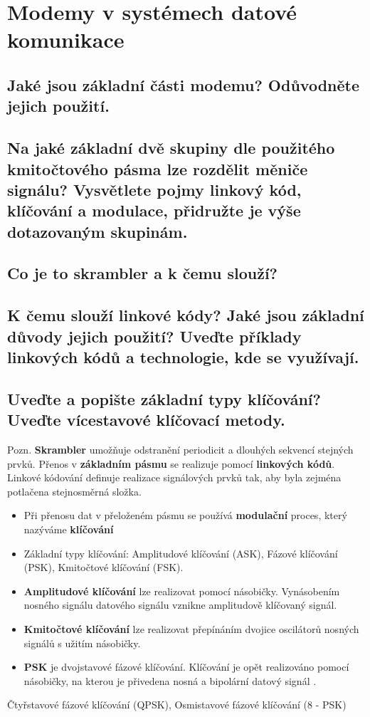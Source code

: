 \clearpage
\section{Modemy v systémech datové komunikace}
\subsection{Jaké jsou základní části modemu? Odůvodněte jejich použití.}

\subsection{Na jaké základní dvě skupiny dle použitého kmitočtového pásma lze rozdělit měniče
signálu? Vysvětlete pojmy linkový kód, klíčování a modulace, přidružte je výše
dotazovaným skupinám.}

\subsection{Co je to skrambler a k čemu slouží?}

\subsection{K čemu slouží linkové kódy? Jaké jsou základní důvody jejich použití? Uveďte příklady
linkových kódů a technologie, kde se využívají.}

\subsection{Uveďte a popište základní typy klíčování? Uveďte vícestavové klíčovací metody.}
Pozn. \textbf{Skrambler} umožňuje odstranění periodicit a dlouhých sekvencí stejných prvků. Přenos v \textbf{základním pásmu} se realizuje pomocí \textbf{linkových kódů}. Linkové kódování definuje realizace signálových prvků tak, aby byla zejména potlačena stejnosměrná složka.
\begin{itemize}
    \item Při přenosu dat v přeloženém pásmu se používá \textbf{modulační} proces, který nazýváme \textbf{klíčování}
    \item Základní typy klíčování: Amplitudové klíčování (ASK), Fázové klíčování (PSK), Kmitočtové klíčování (FSK).
    \item \textbf{Amplitudové klíčování} lze realizovat pomocí násobičky. Vynásobením nosného signálu datového signálu vznikne amplitudově klíčovaný signál. 
    \item \textbf{Kmitočtové klíčování} lze realizovat přepínáním dvojice oscilátorů nosných signálů s užitím násobičky.
    \item \textbf{PSK} je dvojstavové fázové klíčování. Klíčování je opět realizováno pomocí násobičky, na kterou je přivedena nosná a bipolární datový signál .
\end{itemize}
Čtyřstavové fázové klíčování (QPSK), Osmistavové fázové klíčování (8 - PSK)

